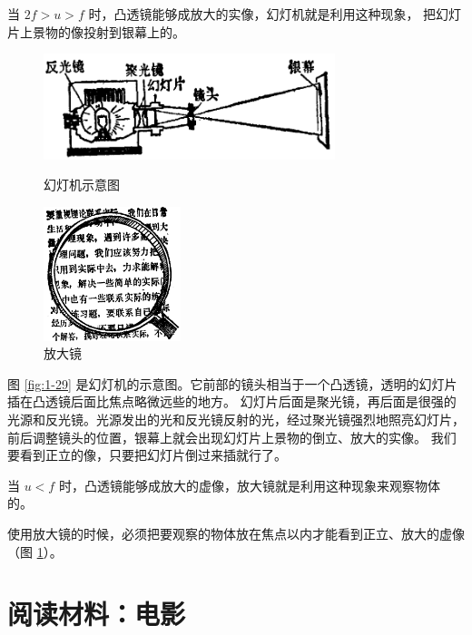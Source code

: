  当 $2f > u > f$ 时，凸透镜能够成放大的实像，幻灯机就是利用这种现象，
把幻灯片上景物的像投射到银幕上的。

\begin{figure}[htbp]
    \centering
    \begin{minipage}{9cm}
    \centering
    \includegraphics[width=8.5cm]{../pic/czwl2-ch1-29}
    \caption{幻灯机示意图}\label{fig:1-29}
    \end{minipage}
    \qquad
    \begin{minipage}{6cm}
    \centering
    \includegraphics[width=4cm]{../pic/czwl2-ch1-30}
    \caption{放大镜}\label{fig:1-30}
    \end{minipage}
\end{figure}


图 \ref{fig:1-29} 是幻灯机的示意图。它前部的镜头相当于一个凸透镜，透明的幻灯片插在凸透镜后面比焦点略微远些的地方。
幻灯片后面是聚光镜，再后面是很强的光源和反光镜。光源发出的光和反光镜反射的光，经过聚光镜强烈地照亮幻灯片，
前后调整镜头的位置，银幕上就会出现幻灯片上景物的倒立、放大的实像。
我们要看到正立的像，只要把幻灯片倒过来插就行了。

 当 $u < f$ 时，凸透镜能够成放大的虚像，放大镜就是利用这种现象来观察物体的。

使用放大镜的时候，必须把要观察的物体放在焦点以内才能看到正立、放大的虚像（图 \ref{fig:1-30}）。



\section*{阅读材料：电影}

